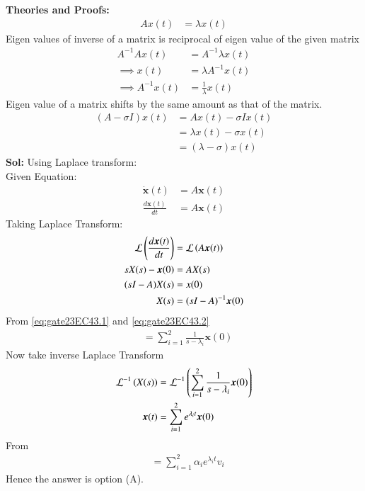 \documentclass[journal,12pt,onecolumn]{IEEEtran}
\theoremstyle{remark}
\begin{document}
\textbf{Theories and Proofs:} \\
\begin{align}
Ax(t) &= \lambda x(t) 
\end{align}
Eigen values of inverse of a matrix is reciprocal of eigen value of the given matrix\\
\begin{align}
A^{-1}Ax(t) &= A^{-1}\lambda x(t) \\ \implies
x(t) &= \lambda A^{-1}x(t)  \\ \implies
A^{-1} x(t) &= \frac{1}{\lambda}x(t) \label{eq:gate23EC43.1}
\end{align}
Eigen value of a matrix shifts by the same amount as that of the matrix.\\
\begin{align}
(A - \sigma I)x(t) &= Ax(t) - \sigma Ix(t) \\
&= \lambda x(t) - \sigma x(t) \\
&= (\lambda - \sigma) x(t) \label{eq:gate23EC43.2}
\end{align}
\textbf{Sol:}
Using Laplace transform: \\
Given Equation:
\begin{align}
\dot{\bm{x}}(t) &= A\bm{x}(t) \\
\frac{d\bm{x}(t)}{dt} &= A\bm{x}(t) 
\end{align}
Taking Laplace Transform:
\begin{align}
\mathcal{L}\left(\frac{d\bm{x}(t)}{dt}\right) &= \mathcal{L}\left(A\bm{x}(t)\right) \\
sX(s) - \bm{x}(0) &= AX(s) \\
(sI - A)X(s) &= x(0) \\
X(s) &= (sI - A)^{-1}\bm{x}(0) 
\end{align}
From \eqref{eq:gate23EC43.1} and \eqref{eq:gate23EC43.2}
\begin{align}
&= \sum_{i=1}^{2}\frac{1}{s-\lambda_i}\bm{x}(0) 
\end{align}
Now take inverse Laplace Transform
\begin{align}
\mathcal{L}^{-1}\left(X(s)\right) &= \mathcal{L}^{-1}\left(\sum_{i=1}^{2}\frac{1}{s-\lambda_i}\bm{x}(0)\right) \\
\bm{x}(t) &= \sum_{i=1}^{2} e^{\lambda_it}\bm{x}(0) 
\end{align}
From 
\begin{align}
&= \sum_{i=1}^{2}\alpha_ie^{\lambda_it}v_i
\end{align} 
Hence the answer is option (A).
\end{document}
